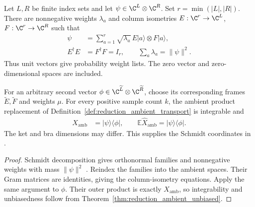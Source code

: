 \begin{theorem}
    \label{thm:construction_schmidt}
    \leanok
    Let $L,R$ be finite index sets and let
    $\psi\in\C^L\otimes\C^R$. Set $r=\min(|L|,|R|)$.
    There are nonnegative weights $\lambda_a$ and column isometries
    $E:\C^r\to\C^L$, $F:\C^r\to\C^R$ such that
    \begin{align}
        \psi        & =\sum_{a=1}^r\sqrt{\lambda_a}\,E|a\rangle\otimes F|a\rangle,
        \label{eq:construction_schmidt_vector}                                     \\
        E^\dagger E & =F^\dagger F=I_r,
        \qquad \sum_a\lambda_a=\lVert\psi\rVert^2.
        \label{eq:construction_schmidt_mass}
    \end{align}
    Thus unit vectors give probability weight lists. The zero vector
    and zero-dimensional spaces are included.

    For an arbitrary second vector
    $\phi\in\C^{\widetilde L}\otimes\C^{\widetilde R}$, choose its
    corresponding frames $\widetilde E,\widetilde F$ and weights $\mu$.
    For every positive sample count $k$, the ambient product replacement
    of Definition~\ref{def:reduction_ambient_transport} is integrable and
    \begin{align}
        X_{\mathrm{amb}} & =|\psi\rangle\langle\phi|,
        \qquad
        \mathbb E\widehat X_{\mathrm{amb}}=|\psi\rangle\langle\phi|.
        \label{eq:construction_schmidt_replacement}
    \end{align}
    The ket and bra dimensions may differ. This supplies the Schmidt
    coordinates in \cite[Equation~(5.6)]{OpenAI2026PolynomialPEPS}.
\end{theorem}

\begin{proof}\leanok
    Schmidt decomposition gives orthonormal families and nonnegative
    weights with mass $\lVert\psi\rVert^2$
    \cite[Proposition~1.1]{Wolf2012Quantum}.
    Reindex the families into the ambient spaces. Their Gram matrices
    are identities, giving the column-isometry equations.
    Apply the same argument to $\phi$. Their outer product is exactly
    $X_{\mathrm{amb}}$, so integrability and unbiasedness follow from
    Theorem~\ref{thm:reduction_ambient_unbiased}.
\end{proof}



